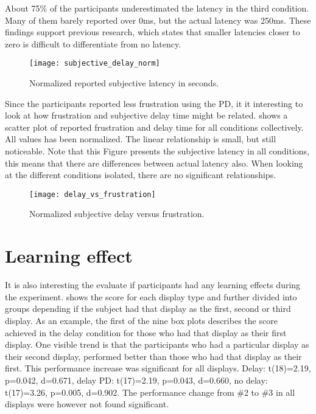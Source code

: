 About 75\% of the participants underestimated the latency in the third condition. Many of them barely reported over 0ms, but the actual latency was 250ms. These findings support previous research, which states that smaller latencies closer to zero is difficult to differentiate from no latency.

\begin{figure}[h!]
    \centering
    \texttt{[image: subjective\_delay\_norm]}
    \caption{Normalized reported subjective latency in seconds.}
    \label{subjective_delay_norm}
\end{figure}

\clearpage
Since the participants reported less frustration using the PD, it it interesting to look at how frustration and subjective delay time might be related.  shows a scatter plot of reported frustration and delay time for all conditions collectively. All values has been normalized. The linear relationship is small, but still noticeable. Note that this Figure presents the subjective latency in all conditions, this means that there are differences between actual latency also. When looking at the different conditions isolated, there are no significant relationships.

\begin{figure}[h!]
    \centering
    \texttt{[image: delay\_vs\_frustration]}
    \caption{Normalized subjective delay versus frustration.}
    \label{delay_vs_frustration}
\end{figure}

\clearpage
\section{Learning effect}

It is also interesting the evaluate if participants had any learning effects during the experiment.  shows the score for each display type and further divided into groups depending if the subject had that display as the first, second or third display. As an example, the first of the nine box plots describes the score achieved in the delay condition for those who had that display as their first display. One visible trend is that the participants who had a particular display as their second display, performed better than those who had that display as their first. This performance increase was significant for all displays. Delay: t(18)=2.19, p=0.042, d=0.671, delay PD: t(17)=2.19, p=0.043, d=0.660, no delay: t(17)=3.26, p=0.005, d=0.902. The performance change from \#2 to \#3 in all displays were however not found significant.

